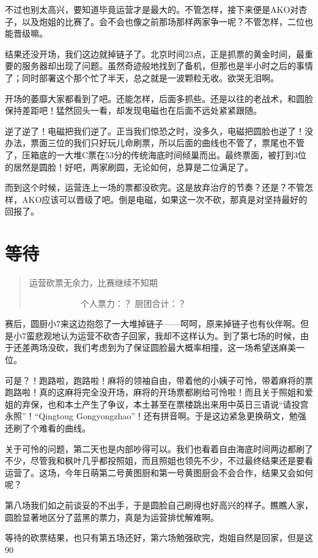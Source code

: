 不过也别太高兴，要知道毕竟运营才是最大的。不管怎样，接下来便是AKO对杏子，以及炮姐的比赛了。会不会也像之前那场那样两家争一呢？不管怎样，二位也能晋级嘛。

结果还没开场，我们这边就掉链子了。北京时间23点，正是抓票的黄金时间，最重要的服务器却出现了问题。虽然奇迹般地找到了备机，但那也是半小时之后的事情了；同时部署这个那个忙了半天，总之就是一波颗粒无收。欲哭无泪啊。

开场的萎靡大家都看到了吧。还能怎样，后面多抓些。还是以往的老战术，和圆脸保持差距吧！猛然回头一看，却发现电磁也在后面不远处紧紧跟随。

逆了逆了！电磁把我们逆了。正当我们惊恐之时，没多久，电磁把圆脸也逆了！没办法，票面三位的我们只好玩儿命刷票，所以后面的曲线也不管了，票尾也不管了，压箱底的一大堆C票在53分的传统海底时间倾巢而出。最终票面，被打到3位的居然是圆脸！好吧，两家刷圆，无论如何，总算是二位满足了。

而到这个时候，运营连上一场的票都没砍完。这是放弃治疗的节奏？还是？不管怎样，AKO应该可以晋级了吧。倒是电磁，如果这一次不砍，那真是对坚持最好的回报了。


\section{等待}
\begin{quote}
运营砍票无余力，比赛继续不知期

　　　　　　个人票力：？ 厨团合计：？
\end{quote}

赛后，圆厨小7来这边抱怨了一大堆掉链子——呵呵，原来掉链子也有伙伴啊。但是小7蛮悲观地认为运营不砍杏子回家，我却不这样认为。到了第七场的时候，由于还差两场没砍，我们考虑到为了保证圆脸最大概率相撞，这一场希望送麻美一位。

可是？！跑路啦，跑路啦！麻将的领袖自由，带着他的小姨子可怜，带着麻将的票跑路啦！真的这麻将完全没开场，麻将的开场票都刷给可怜啦！而且关于照姐和爱姐的弃保，也和本土产生了争议，本土甚至在票楼跳出来用中英日三语说“请投宫永照”！“Qingtoug Gongyongzhao”！还有拼音啊。于是这边紧急更换萌文，勉强还刷了个难看的曲线。

关于可怜的问题，第二天也是内部吵得可以。我们也看着自由海底时间两边都刷了不少，尽管我和枫叶几乎都投照姐，而且照姐也领先不少，不过最终结果还是要看运营了。这场，今年日萌第二号黄图厨和第一号黄图厨会不会合作，结果又会如何呢？

第八场我们如之前谈妥的不出手，于是圆脸自己刷得也好高兴的样子。瞧瞧人家，圆脸显著地区分了蓝黑的票力，真是为运营排忧解难啊。

等待的砍票结果，也只有第五场还好，第六场勉强砍完，炮姐自然是回家，但是这90%

